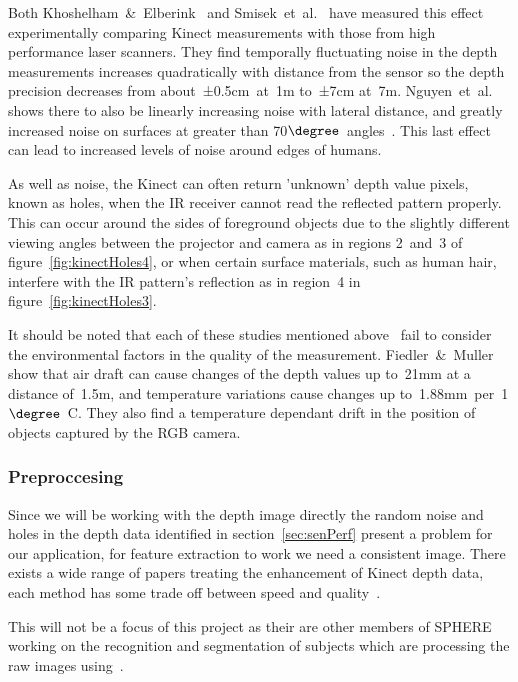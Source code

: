 \documentclass[11pt]{article} %
\begin{document}
Both Khoshelham~\&~Elberink~\cite{Khoshelham2012a} and Smisek~et~al.~\cite{Smisek2011} have measured this effect experimentally comparing Kinect measurements with those from high performance laser scanners. They find temporally fluctuating noise in the depth measurements increases quadratically with distance from the sensor so the depth precision decreases from about~±0.5cm~at~1m to~±7cm at~7m. Nguyen~et~al. shows there to also be linearly increasing noise with lateral distance, and greatly increased noise on surfaces at greater than 70$\degree$~angles~\cite{Nguyen2012}. This last effect can lead to increased levels of noise around edges of humans. 

As well as noise, the Kinect can often return 'unknown' depth value pixels, known as holes, when the IR receiver cannot read the reflected pattern properly. This can occur around the sides of foreground objects due to the slightly different viewing angles between the projector and camera as in regions 2~and~3 of figure~\ref{fig:kinectHoles4}, or when certain surface materials, such as human hair, interfere with the IR pattern's reflection as in region~4 in figure~\ref{fig:kinectHoles3}. 


It should be noted that each of these studies mentioned above~\cite{Khoshelham2012a,Smisek2011,Nguyen2012} fail to consider the environmental factors in the quality of the measurement. Fiedler~\&~Muller \cite{Fiedler2013} show that air draft can cause changes of the depth values up to~21mm at a distance of~1.5m, and temperature variations cause changes up to~1.88mm~per~1$\degree$~C. They also find a temperature dependant drift in the position of objects captured by the RGB camera.

\subsubsection{Preproccesing}

Since we will be working with the depth image directly the random noise and holes in the depth data identified in section~\ref{sec:senPerf} present a problem for our application, for feature extraction to work we need a consistent image. There exists a wide range of papers treating the enhancement of Kinect depth data, each method has some trade off between speed and quality~\cite{Camplani2012,Miao2012,Yang2012a,Chen2013c,Feng2013,Hu2013a,Liu2013,Matsuo2013,Shen2013,Chen2014,Chiu2014,Kim2014,Le2014,Shen2014,Stommel2014}.

This will not be a focus of this project as their are other members of SPHERE working on the recognition and segmentation of subjects which are processing the raw images using~\cite{Camplani2012}.
\end{document}
